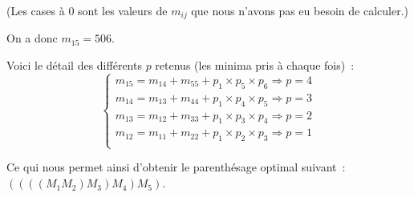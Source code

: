 (Les cases à $0$ sont les valeurs de $m_{ij}$ que nous n'avons pas eu
besoin de calculer.)

On a donc $m_{15} = 506$.

Voici le détail des différents $p$ retenus (les minima pris à chaque
fois)~:
\begin{equation}
\begin{cases}
m_{15} = m_{14} + m_{55} + p_1 \times p_5 \times p_6  \Rightarrow p =
4\\
m_{14} = m_{13} + m_{44} + p_1 \times p_4 \times p_5  \Rightarrow p = 3\\
m_{13} = m_{12} + m_{33} + p_1 \times p_3 \times p_4  \Rightarrow p =
2\\
m_{12} = m_{11} + m_{22} + p_1 \times p_2 \times p_3  \Rightarrow p = 1\\
\end{cases}
\end{equation}

Ce qui nous permet ainsi d'obtenir le parenthésage optimal suivant~: $((((M_1M_2)M_3)M_4)M_5)$.

